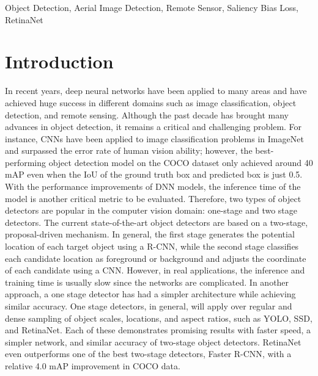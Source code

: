 \documentclass[conference]{IEEEtran}
\begin{document}
\begin{IEEEkeywords}
    Object Detection, Aerial Image Detection, Remote Sensor, Saliency Bias Loss, RetinaNet
\end{IEEEkeywords}

\section{Introduction}
    In recent years, deep neural networks have been applied to many areas and have achieved huge success in different domains such as image classification\cite{krizhevsky2012imagenet,simonyan2014very,he2016deep}, object detection\cite{girshick2014rich,ren2015faster,he2017mask,lin2017feature,redmon2017yolo9000,dai2016r,shrivastava2016training,liu2016ssd}, and remote sensing\cite{chen2017automatic,tang2017vehicle,sommer2017deep,yang2018automatic}. Although the past decade has brought many advances in object detection, it remains a critical and challenging problem. For instance, CNNs have been applied to image classification problems in ImageNet\cite{deng2009imagenet} and surpassed the error rate of human vision ability; however, the best-performing object detection model on the COCO dataset\cite{lin2014microsoft} only achieved around 40 mAP even when the IoU of the ground truth box and predicted box is just 0.5. With the performance improvements of DNN models, the inference time of the model is another critical metric to be evaluated. Therefore, two types of object detectors are popular in the computer vision domain: one-stage and two stage detectors. The current state-of-the-art object detectors are based on a two-stage, proposal-driven mechanism. In general, the first stage generates the potential location of each target object using a R-CNN\cite{girshick2014rich}, while the second stage classifies each candidate location as foreground or background and adjusts the coordinate of each candidate using a CNN. However, in real applications, the inference and training time is usually slow since the networks are complicated. In another approach, a one stage detector has had a simpler architecture while achieving similar accuracy. One stage detectors, in general, will apply over regular and dense sampling of object scales, locations, and aspect ratios, such as YOLO\cite{redmon2017yolo9000}, SSD\cite{liu2016ssd}, and RetinaNet\cite{lin2017focal}. Each of these demonstrates promising results with faster speed, a simpler network, and similar accuracy of two-stage object detectors. RetinaNet\cite{lin2017focal} even outperforms one of the best two-stage detectors, Faster R-CNN\cite{ren2015faster}, with a relative 4.0 mAP improvement in COCO data\cite{lin2014microsoft}.
    
\end{document}
